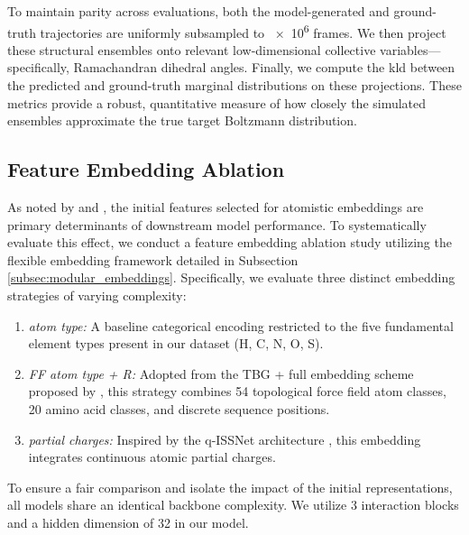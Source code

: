To maintain parity across evaluations, both the model-generated and ground-truth trajectories are uniformly subsampled to \num{e6} frames. We then project these structural ensembles onto relevant low-dimensional collective variables—specifically, Ramachandran dihedral angles. Finally, we compute the \gls{kld} between the predicted and ground-truth marginal distributions on these projections. These metrics provide a robust, quantitative measure of how closely the simulated ensembles approximate the true target Boltzmann distribution.


\subsection{Feature Embedding Ablation}
\label{subsec:feature_embedding_ablation}

As noted by \citet{klein_transferable_2024} and \citet{machine_learning_implicit_solvation}, the initial features selected for atomistic embeddings are primary determinants of downstream model performance. To systematically evaluate this effect, we conduct a feature embedding ablation study utilizing the flexible embedding framework detailed in Subsection \ref{subsec:modular_embeddings}. Specifically, we evaluate three distinct embedding strategies of varying complexity:

\begin{enumerate}
    \item \textit{atom type:} A baseline categorical encoding restricted to the five fundamental element types present in our dataset (H, C, N, O, S).
    \item \textit{FF atom type + R:} Adopted from the TBG + full embedding scheme proposed by \citet{klein_transferable_2024}, this strategy combines 54 topological force field atom classes, 20 amino acid classes, and discrete sequence positions.
    \item \textit{partial charges:} Inspired by the q-ISSNet architecture \citep{machine_learning_implicit_solvation}, this embedding integrates continuous atomic partial charges.
\end{enumerate}

To ensure a fair comparison and isolate the impact of the initial representations, all models share an identical backbone complexity. We utilize 3 interaction blocks and a hidden dimension of 32 in our model.

